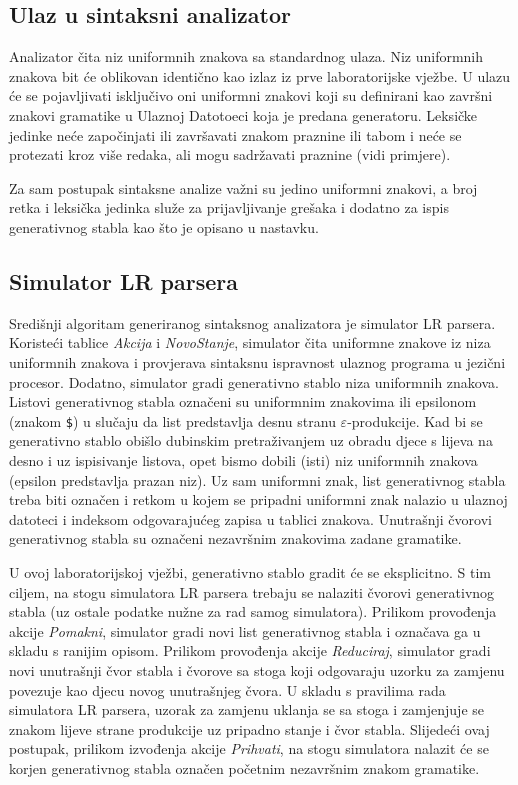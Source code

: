 \documentclass[times, 12pt, utf8]{book}
\begin{document}
\subsection{Ulaz u sintaksni analizator}
Analizator čita niz uniformnih znakova sa standardnog ulaza.
Niz uniformnih znakova bit će oblikovan identično kao izlaz iz prve laboratorijske vježbe.
U ulazu će se pojavljivati isključivo oni uniformni znakovi koji su definirani kao završni znakovi gramatike u Ulaznoj Datotoeci koja je predana generatoru.
Leksičke jedinke neće započinjati ili završavati znakom praznine ili tabom i neće se protezati kroz više redaka, ali mogu sadržavati praznine (vidi primjere).

Za sam postupak sintaksne analize važni su jedino uniformni znakovi, a broj retka i leksička jedinka služe za prijavljivanje grešaka i dodatno za ispis generativnog stabla kao što je opisano u nastavku.

\subsection{Simulator LR parsera}
Središnji algoritam generiranog sintaksnog analizatora je simulator LR parsera.
Koristeći tablice {\em Akcija} i {\em NovoStanje}, simulator čita uniformne znakove iz niza uniformnih znakova i provjerava sintaksnu ispravnost ulaznog programa u jezični procesor.
Dodatno, simulator gradi generativno stablo niza uniformnih znakova.
Listovi generativnog stabla označeni su uniformnim znakovima ili epsilonom (znakom \verb|$|) u slučaju da list predstavlja desnu stranu \(\varepsilon\)-produkcije.
Kad bi se generativno stablo obišlo dubinskim pretraživanjem uz obradu djece s lijeva na desno i uz ispisivanje listova, opet bismo dobili (isti) niz uniformnih znakova (epsilon predstavlja prazan niz).
Uz sam uniformni znak, list generativnog stabla treba biti označen i retkom u kojem se pripadni uniformni znak nalazio u ulaznoj datoteci i indeksom odgovarajućeg zapisa u tablici znakova.
Unutrašnji čvorovi generativnog stabla su označeni nezavršnim znakovima zadane gramatike.

U ovoj laboratorijskoj vježbi, generativno stablo gradit će se eksplicitno.
S tim ciljem, na stogu simulatora LR parsera trebaju se nalaziti čvorovi generativnog stabla (uz ostale podatke nužne za rad samog simulatora).
Prilikom provođenja akcije {\em Pomakni}, simulator gradi novi list generativnog stabla i označava ga u skladu s ranijim opisom.
Prilikom provođenja akcije {\em Reduciraj}, simulator gradi novi unutrašnji čvor stabla i čvorove sa stoga koji odgovaraju uzorku za zamjenu povezuje kao djecu novog unutrašnjeg čvora.
U skladu s pravilima rada simulatora LR parsera, uzorak za zamjenu uklanja se sa stoga i zamjenjuje se znakom lijeve strane produkcije uz pripadno stanje i čvor stabla.
Slijedeći ovaj postupak, prilikom izvođenja akcije {\em Prihvati}, na stogu simulatora nalazit će se korjen generativnog stabla označen početnim nezavršnim znakom gramatike.
\end{document}
